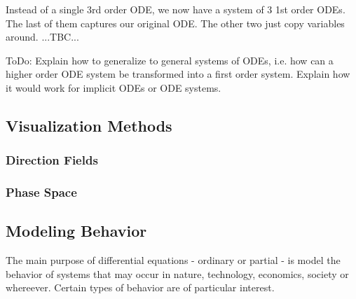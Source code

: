 

Instead of a single 3rd order ODE, we now have a system of 3 1st order ODEs. The last of them captures our original ODE. The other two just copy variables around. ...TBC...


ToDo: Explain how to generalize to general systems of ODEs, i.e. how can a higher order ODE system be transformed into a first order system. Explain how it would work for implicit ODEs or ODE systems.


\subsection{Visualization Methods}

\subsubsection{Direction Fields}


\subsubsection{Phase Space}





\subsection{Modeling Behavior}
The main purpose of differential equations - ordinary or partial - is model the behavior of systems that may occur in nature, technology, economics, society or whereever. Certain types of behavior are of particular interest.

